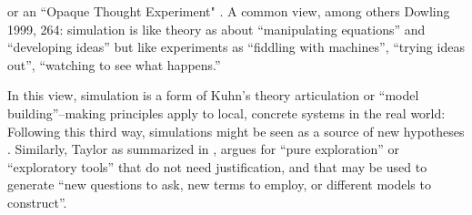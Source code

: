 \label{a-third-way-neither-experimental-or-theoretical}

\parencite[31]{Winsberg2010} or an ``Opaque Thought Experiment" \parencite{DiPaolo2000}. A common view, among others Dowling 1999, 264: simulation is like theory as about ``manipulating equations'' and ``developing ideas'' but like experiments as ``fiddling with machines'', ``trying ideas out'', ``watching to see what happens.'' 

In this view, simulation is a form of Kuhn's theory articulation or ``model building''--making principles apply to local, concrete systems in the real world:  Following this third way, simulations might be seen as a source of new hypotheses \parencite{Eldridge}. Similarly, Taylor as summarized in \parencite{Webb2009}, argues for ``pure exploration'' or ``exploratory tools'' that do not need justification, and that may be used to generate ``new questions to ask, new terms to employ, or different models to construct''.


